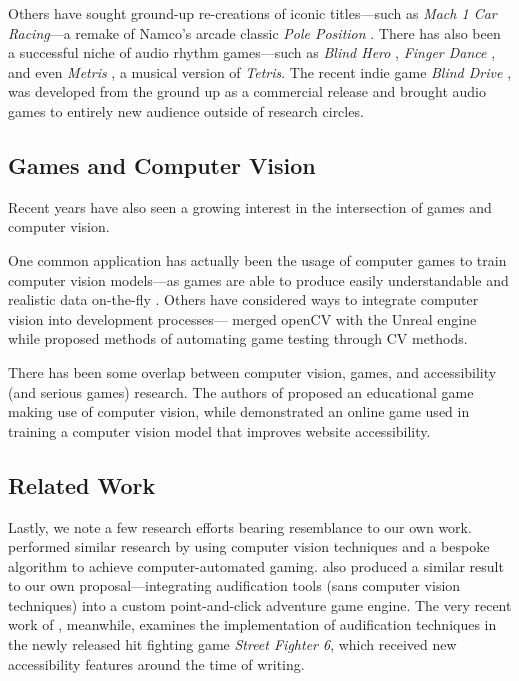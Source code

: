 \documentclass{report}
\begin{document}
Others have sought ground-up re-creations of iconic titles---such as \emph{Mach 1 Car Racing}---a remake of Namco's arcade classic \emph{Pole Position} \cite{friberg2004audio}. There has also been a successful niche of audio rhythm games---such as \emph{Blind Hero} \cite{yuan2008blind}, \emph{Finger Dance} \cite{miller2007finger}, and even \emph{Metris} \cite{metris}, a musical version of \emph{Tetris}. The recent indie game \emph{Blind Drive} \cite{blinddrive}, was developed from the ground up as a commercial release and brought audio games to entirely new audience outside of research circles.

\subsection{Games and Computer Vision}
Recent years have also seen a growing interest in the intersection of games and computer vision. 

One common application has actually been the usage of computer games to train computer vision models---as games are able to produce easily understandable and realistic data on-the-fly \cite{shafaei2016play} \cite{richter2016playing}. Others have considered ways to integrate computer vision into development processes---\cite{qiu2016unrealcv} merged openCV with the Unreal engine while \cite{paduraru2021automated} proposed methods of automating game testing through CV methods.

There has been some overlap between computer vision, games, and accessibility (and serious games) research. The authors of \cite{chursin2021using} proposed an educational game making use of computer vision, while \cite{webgame} demonstrated an online game used in training a computer vision model that improves website accessibility.

\subsection{Related Work}

Lastly, we note a few research efforts bearing resemblance to our own work. \cite{erdelyi2019using} performed similar research by using computer vision techniques and a bespoke algorithm to achieve computer-automated gaming. \cite{vallejo2011applying} also produced a similar result to our own proposal---integrating audification tools (sans computer vision techniques) into a custom point-and-click adventure game engine. The very recent work of \cite{StreetFighter}, meanwhile, examines the implementation of audification techniques in the newly released hit fighting game \emph{Street Fighter 6}, which received new accessibility features around the time of writing. 
\end{document}
